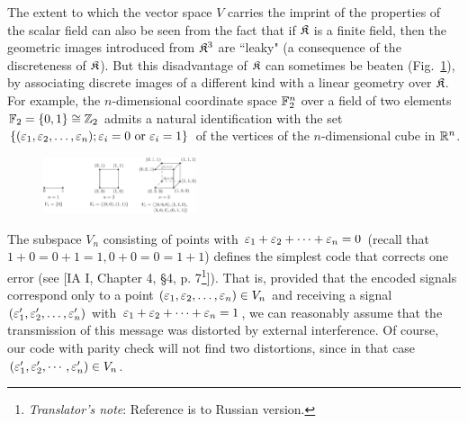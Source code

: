 The extent to which the vector space $V$ carries the imprint of the properties of the scalar field can also be seen from the fact that if ${\mathfrak{K}}$ is a finite field, then the geometric images introduced from ${\mathfrak{K}}^3$ are ``leaky" (a consequence of the discreteness of ${\mathfrak{K}}$). But this disadvantage of ${\mathfrak{K}}$ can sometimes be beaten (Fig.~\ref{fig:discrete-image}), by associating discrete images of a different kind with a linear geometry over ${\mathfrak{K}}$. For example, the $n$-dimensional coordinate space ${\mathbb{F}}_2^n$ over a field of two elements ${\mathbb{F}}_2 =\{0,1\}\cong{\mathbb{Z}}_2$ admits a natural identification with the set $\{(\varepsilon_1 ,\varepsilon_2 ,\dots ,\varepsilon_n ); \varepsilon_i =0 \text{ or } \varepsilon_i = 1\}$ of the vertices of the $n$-dimensional cube in ${\mathbb{R}}^n$.

\begin{figure}
	\centering
	\includegraphics[width=0.4\textwidth]{../fig/fig-1.pdf}
	\caption{}
	\label{fig:discrete-image}
\end{figure}

The subspace $V_n$ consisting of points with $\varepsilon_1 +\varepsilon_2 + \dots + \varepsilon_n = 0$ (recall that $1 + 0 = 0 + 1 = 1, 0 + 0 = 0 = 1 + 1$) defines the simplest code that corrects one error (see [IA I, Chapter 4, \S4, p. 7\footnote{\textit{Translator's note}: Reference is to Russian version.}]). That is, provided that the encoded signals correspond only to a point $(\varepsilon_1 ,\varepsilon_2 ,\dots ,\varepsilon_n )\in V_n$ and receiving a signal $(\varepsilon_1 ',\varepsilon_2 ',\dots ,\varepsilon_n ')$ with $\varepsilon_1 +\varepsilon_2 + \dots + \varepsilon_n = 1$, we can reasonably assume that the transmission of this message was distorted by external interference. Of course, our code with parity check will not find two distortions, since in that case $(\varepsilon_1 ',\varepsilon_2 ',\cdots ,\varepsilon_n ') \in V_n$.